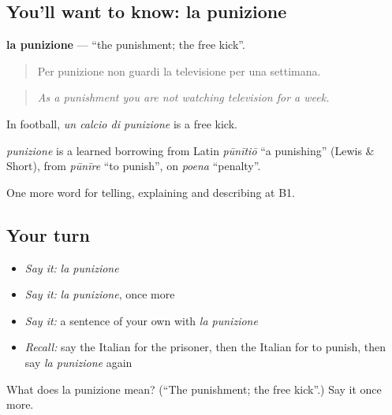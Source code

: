 \subsection*{You'll want to know: la punizione}
\textbf{la punizione} — \textquotedblleft{}the punishment; the free kick\textquotedblright{}.

\begin{quote}
Per punizione non guardi la televisione per una settimana.
\end{quote}

\begin{quote}
\emph{As a punishment you are not watching television for a week.}
\end{quote}

In football, \emph{un calcio di punizione} is a free kick.

\begin{cousinweb}
\emph{punizione} is a learned borrowing from Latin \emph{pūnītiō} \textquotedblleft{}a punishing\textquotedblright{} (Lewis \& Short), from \emph{pūnīre} \textquotedblleft{}to punish\textquotedblright{}, on \emph{poena} \textquotedblleft{}penalty\textquotedblright{}.
\end{cousinweb}

\begin{grammarlens}[title={What you've built}]
One more word for telling, explaining and describing at B1.
\end{grammarlens}

\subsection*{Your turn}
\begin{itemize}
\raggedright
  \item \emph{Say it:} \emph{la punizione}
  \item \emph{Say it:} \emph{la punizione}, once more
  \item \emph{Say it:} a sentence of your own with \emph{la punizione}
  \item \emph{Recall:} say the Italian for the prisoner, then the Italian for to punish, then say \emph{la punizione} again
\end{itemize}

\begin{tcolorbox}[breakable,colback=teal!4,colframe=teal!35!black,title={Before you move on}]
What does la punizione mean? (\textquotedblleft{}The punishment; the free kick\textquotedblright{}.) Say it once more.
\end{tcolorbox}
